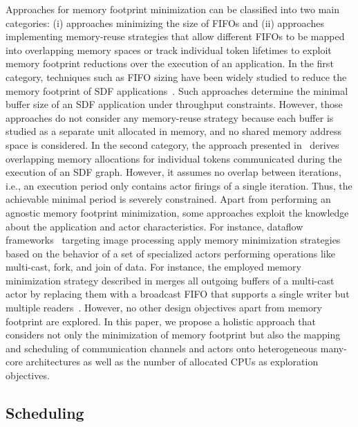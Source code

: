 Approaches for memory footprint minimization can be classified into two main categories: (i) approaches minimizing the size of \acp{FIFO} and (ii) approaches implementing memory-reuse strategies that allow different \acp{FIFO} to be mapped into overlapping memory spaces or track individual token lifetimes to exploit memory footprint reductions over the execution of an application.
In the first category, techniques such as \ac{FIFO} sizing have been widely studied to reduce the memory footprint of \ac{SDF} applications~\cite{Stuijk:2006,Benazouz:2010,Tang:2017}.
Such approaches determine the minimal buffer size of an \ac{SDF} application under throughput constraints.
However, those approaches do not consider any memory-reuse strategy because each buffer is studied as a separate unit allocated in memory, and no shared memory address space is considered.
In the second category, the approach presented in~\cite{desnos2015memory} derives overlapping memory allocations for individual tokens communicated during the execution of an \ac{SDF} graph.
However, it assumes no overlap between iterations, i.e., an execution period only contains actor firings of a single iteration.
Thus, the achievable minimal period is severely constrained.
Apart from performing an agnostic memory footprint minimization, some approaches exploit the knowledge about the application and actor characteristics.
For instance, dataflow frameworks~\cite{memFIFO,Yviquel:2015,Mamidala:2011} targeting image processing apply memory minimization strategies based on the behavior of a set of specialized actors performing operations like multi-cast, fork, and join of data.
For instance, the employed memory minimization strategy described in \cite{Mamidala:2011} merges all outgoing buffers of a multi-cast actor by replacing them with a broadcast \ac{FIFO} that supports a single writer but multiple readers~\cite{Mamidala:2011}.
However, no other design objectives apart from memory footprint are explored.
In this paper, we propose a holistic approach that considers not only the minimization of memory footprint but also the mapping and scheduling of communication channels and actors onto heterogeneous many-core architectures as well as the number of allocated CPUs as exploration objectives.

\subsection{Scheduling}

